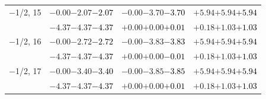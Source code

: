 \documentclass[compress]{beamer}
\begin{document}
\begin{frame}
\begin{tabular}{r | c | c | c}
$-$1/2, 15 & $-0.00$\hspace{0.1 cm}$-2.07$\hspace{0.1 cm}\textcolor{black}{$-2.07$} & $-0.00$\hspace{0.1 cm}$-3.70$\hspace{0.1 cm}\textcolor{black}{$-3.70$} & $+5.94$\hspace{0.1 cm}$+5.94$\hspace{0.1 cm}\textcolor{black}{$+5.94$} \\
           & $-4.37$\hspace{0.1 cm}$-4.37$\hspace{0.1 cm}\textcolor{black}{$-4.37$} & $+0.00$\hspace{0.1 cm}$+0.00$\hspace{0.1 cm}\textcolor{black}{$+0.01$} & $+0.18$\hspace{0.1 cm}$+1.03$\hspace{0.1 cm}\textcolor{black}{$+1.03$} \\
$-$1/2, 16 & $-0.00$\hspace{0.1 cm}$-2.72$\hspace{0.1 cm}\textcolor{black}{$-2.72$} & $-0.00$\hspace{0.1 cm}$-3.83$\hspace{0.1 cm}\textcolor{black}{$-3.83$} & $+5.94$\hspace{0.1 cm}$+5.94$\hspace{0.1 cm}\textcolor{black}{$+5.94$} \\
           & $-4.37$\hspace{0.1 cm}$-4.37$\hspace{0.1 cm}\textcolor{black}{$-4.37$} & $+0.00$\hspace{0.1 cm}$+0.00$\hspace{0.1 cm}\textcolor{black}{$-0.01$} & $+0.18$\hspace{0.1 cm}$+1.03$\hspace{0.1 cm}\textcolor{black}{$+1.03$} \\
$-$1/2, 17 & $-0.00$\hspace{0.1 cm}$-3.40$\hspace{0.1 cm}\textcolor{black}{$-3.40$} & $-0.00$\hspace{0.1 cm}$-3.85$\hspace{0.1 cm}\textcolor{black}{$-3.85$} & $+5.94$\hspace{0.1 cm}$+5.94$\hspace{0.1 cm}\textcolor{black}{$+5.94$} \\
           & $-4.37$\hspace{0.1 cm}$-4.37$\hspace{0.1 cm}\textcolor{black}{$-4.37$} & $+0.00$\hspace{0.1 cm}$+0.00$\hspace{0.1 cm}\textcolor{black}{$+0.01$} & $+0.18$\hspace{0.1 cm}$+1.03$\hspace{0.1 cm}\textcolor{black}{$+1.03$} \\

\end{tabular}
\end{frame}
\end{document}
